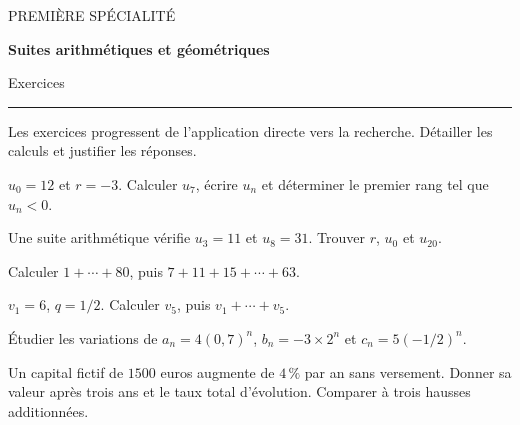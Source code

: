\documentclass[11pt,a4paper]{article}
\begin{document}
{\small\color{Blue}PREMIÈRE SPÉCIALITÉ}\par{\LARGE\bfseries Suites arithmétiques et géométriques}\par{\large Exercices}\par\vspace{0.2cm}\hrule\vspace{0.4cm}
Les exercices progressent de l’application directe vers la recherche. Détailler les calculs et justifier les réponses.
\par\noindent\begin{minipage}{\linewidth}
$u_0=12$ et $r=-3$. Calculer $u_7$, écrire $u_n$ et déterminer le premier rang tel que $u_n<0$.
\end{minipage}\par
\par\noindent\begin{minipage}{\linewidth}
Une suite arithmétique vérifie $u_3=11$ et $u_8=31$. Trouver $r$, $u_0$ et $u_{20}$.
\end{minipage}\par
\par\noindent\begin{minipage}{\linewidth}
Calculer $1+\cdots+80$, puis $7+11+15+\cdots+63$.
\end{minipage}\par
\par\noindent\begin{minipage}{\linewidth}
$v_1=6$, $q=1/2$. Calculer $v_5$, puis $v_1+\cdots+v_5$.
\end{minipage}\par
\par\noindent\begin{minipage}{\linewidth}
Étudier les variations de $a_n=4(0,7)^n$, $b_n=-3\times2^n$ et $c_n=5(-1/2)^n$.
\end{minipage}\par
\par\noindent\begin{minipage}{\linewidth}
Un capital fictif de $1500$ euros augmente de $4\,\%$ par an sans versement. Donner sa valeur après trois ans et le taux total d’évolution. Comparer à trois hausses additionnées.
\end{minipage}\par
\end{document}
